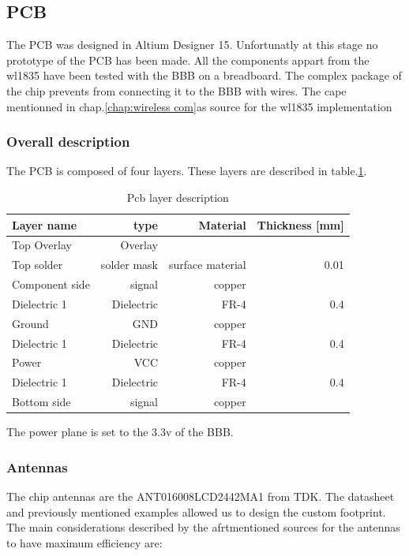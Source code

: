 \subsection{PCB}
\label{chap:pcb}
The PCB was designed in Altium Designer 15. Unfortunatly at this stage no prototype of the PCB has been made. All the components appart from the wl1835 have been tested with the BBB on a breadboard. The complex package of the chip prevents from connecting it to the BBB with wires. The cape mentionned in chap.\ref{chap:wireless com}as source for the wl1835 implementation

\subsubsection{Overall description}
The PCB is composed of four layers. These layers are described in table.\ref{tab:layer description}.
\begin{table}[!htbp]
  \begin{center}
    \begin{tabular}{|l|r|r|r|}%
      \hline
        Layer name & type & Material & Thickness [mm] \\ \hline \hline
        Top Overlay & Overlay & & \\ \hline
        Top solder & solder mask & surface material & 0.01 \\ \hline
        Component side & signal & copper &  \\ \hline
        Dielectric 1 & Dielectric & FR-4 & 0.4 \\ \hline
        Ground & GND & copper &\\ \hline
        Dielectric 1 & Dielectric & FR-4 & 0.4 \\ \hline
        Power & VCC & copper & \\ \hline
        Dielectric 1 & Dielectric & FR-4 & 0.4 \\ \hline
        Bottom side & signal & copper &\\ \hline
         \hline
    \end{tabular}
  \end{center}
  \caption {Pcb layer description} \label{tab:layer description}
\end{table}
The power plane is set to the 3.3v of the BBB.

\subsubsection{Antennas}
The chip antennas are the ANT016008LCD2442MA1 from TDK. The datasheet and previously mentioned examples allowed us to design the custom footprint.
The main considerations described by the afrtmentioned sources for the antennas to have maximum efficiency are:

